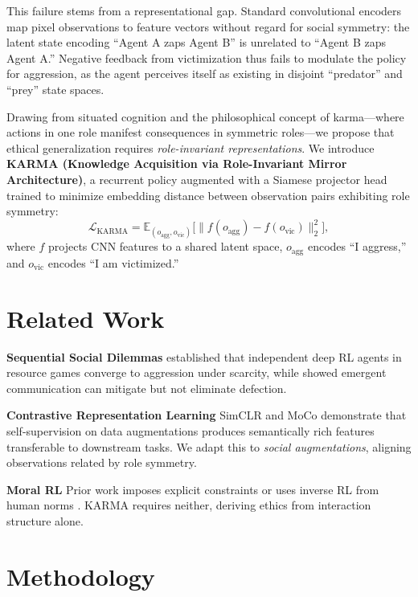 \documentclass[11pt]{article}
\begin{document}
This failure stems from a representational gap. Standard convolutional encoders map pixel observations to feature vectors without regard for social symmetry: the latent state encoding ``Agent A zaps Agent B'' is unrelated to ``Agent B zaps Agent A.'' Negative feedback from victimization thus fails to modulate the policy for aggression, as the agent perceives itself as existing in disjoint ``predator'' and ``prey'' state spaces.

Drawing from situated cognition \citep{robbins2008cambridge} and the philosophical concept of karma---where actions in one role manifest consequences in symmetric roles---we propose that ethical generalization requires \emph{role-invariant representations}. We introduce \textbf{KARMA (Knowledge Acquisition via Role-Invariant Mirror Architecture)}, a recurrent policy augmented with a Siamese projector head trained to minimize embedding distance between observation pairs exhibiting role symmetry:
\begin{equation}
\mathcal{L}_\text{KARMA} = \mathbb{E}_{(o_\text{agg},o_\text{vic})}\Big[\|f(o_\text{agg}) - f(o_\text{vic})\|_2^2\Big],
\end{equation}
where $f$ projects CNN features to a shared latent space, $o_\text{agg}$ encodes ``I aggress,'' and $o_\text{vic}$ encodes ``I am victimized.''

\section{Related Work}

\textbf{Sequential Social Dilemmas} \citet{leibo2017multi} established that independent deep RL agents in resource games converge to aggression under scarcity, while \citet{hu2020other} showed emergent communication can mitigate but not eliminate defection.

\textbf{Contrastive Representation Learning} SimCLR \citep{chen2020simple} and MoCo \citep{he2020momentum} demonstrate that self-supervision on data augmentations produces semantically rich features transferable to downstream tasks. We adapt this to \emph{social augmentations}, aligning observations related by role symmetry.

\textbf{Moral RL} Prior work imposes explicit constraints \citep{neufeld2022reinforcement} or uses inverse RL from human norms \citep{hadfield2016cooperative}. KARMA requires neither, deriving ethics from interaction structure alone.

\section{Methodology}
\end{document}
